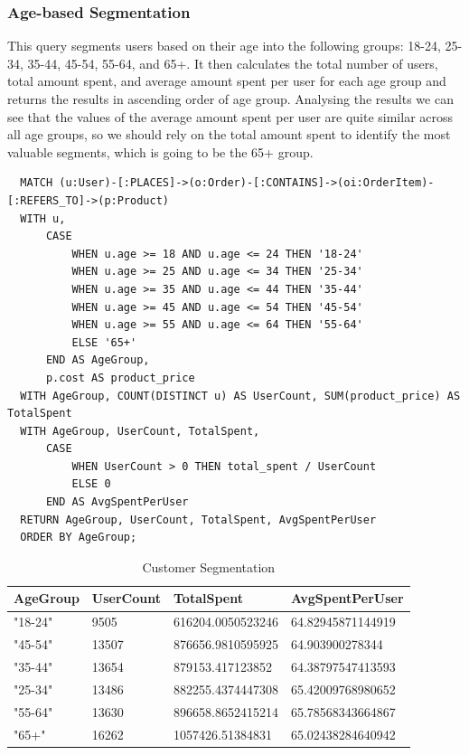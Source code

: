 \documentclass[a4paper,12pt]{article}
\begin{document}
\subsubsection{Age-based Segmentation}
This query segments users based on their age into the following groups: 18-24, 25-34, 35-44, 45-54, 55-64, and 65+.
It then calculates the total number of users, total amount spent, and average amount spent per user for each age group and returns the results in ascending order of age group.
Analysing the results we can see that the values of the average amount spent per user are quite similar across all age groups, so we should rely on the total amount spent to identify the most valuable segments, which is going to be the 65+ group.
\begin{verbatim}
  MATCH (u:User)-[:PLACES]->(o:Order)-[:CONTAINS]->(oi:OrderItem)-[:REFERS_TO]->(p:Product)
  WITH u, 
      CASE 
          WHEN u.age >= 18 AND u.age <= 24 THEN '18-24'
          WHEN u.age >= 25 AND u.age <= 34 THEN '25-34'
          WHEN u.age >= 35 AND u.age <= 44 THEN '35-44'
          WHEN u.age >= 45 AND u.age <= 54 THEN '45-54'
          WHEN u.age >= 55 AND u.age <= 64 THEN '55-64'
          ELSE '65+'
      END AS AgeGroup, 
      p.cost AS product_price
  WITH AgeGroup, COUNT(DISTINCT u) AS UserCount, SUM(product_price) AS TotalSpent
  WITH AgeGroup, UserCount, TotalSpent, 
      CASE 
          WHEN UserCount > 0 THEN total_spent / UserCount
          ELSE 0
      END AS AvgSpentPerUser
  RETURN AgeGroup, UserCount, TotalSpent, AvgSpentPerUser
  ORDER BY AgeGroup;
\end{verbatim}

\begin{table}[h!]
  \centering
  \caption{Customer Segmentation}
  \label{tab:processing_data}
  \begin{tabular}{l l l l}
      \toprule
      \textbf{AgeGroup} & \textbf{UserCount} & \textbf{TotalSpent} & \textbf{AvgSpentPerUser}\\
      \midrule
      "18-24" & 9505 & 616204.0050523246 & 64.82945871144919 \\
      "45-54" & 13507 & 876656.9810595925 & 64.903900278344 \\
      "35-44" & 13654 & 879153.417123852 & 64.38797547413593 \\
      "25-34" & 13486 & 882255.4374447308 & 65.42009768980652 \\
      "55-64" & 13630 & 896658.8652415214 & 65.78568343664867 \\
      "65+" & 16262 & 1057426.51384831 & 65.02438284640942 \\
      \bottomrule
  \end{tabular}
\end{table}
\end{document}
